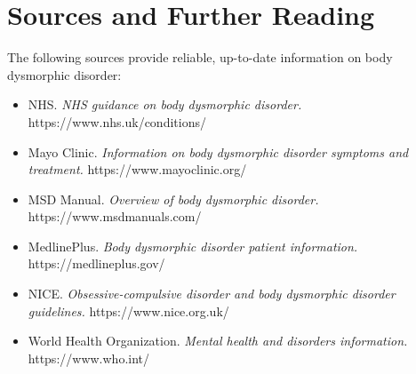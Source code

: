 \section*{Sources and Further Reading}
The following sources provide reliable, up-to-date information on body dysmorphic disorder:

\begin{itemize}
    \item NHS. \textit{NHS guidance on body dysmorphic disorder.} https://www.nhs.uk/conditions/
    \item Mayo Clinic. \textit{Information on body dysmorphic disorder symptoms and treatment.} https://www.mayoclinic.org/
    \item MSD Manual. \textit{Overview of body dysmorphic disorder.} https://www.msdmanuals.com/
    \item MedlinePlus. \textit{Body dysmorphic disorder patient information.} https://medlineplus.gov/
    \item NICE. \textit{Obsessive-compulsive disorder and body dysmorphic disorder guidelines.} https://www.nice.org.uk/
    \item World Health Organization. \textit{Mental health and disorders information.} https://www.who.int/
\end{itemize}
